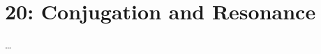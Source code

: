 
\chapter{20: Conjugation and Resonance}\label{20: Conjugation and Resonance}
\begin{adjustwidth}{1cm}{1cm}
  \dots
\end{adjustwidth}



